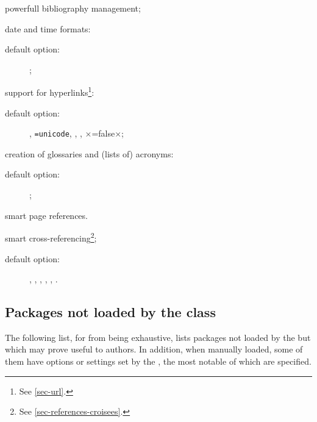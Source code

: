 \documentclass[english,nolocaltoc]{nwejmart}
\newtheorem[style=definition]{fact}
\newtheorem[title=experience]{experience}
\newtheorem[title-plural=rings]{ring}
\newtheorem[title=ideal,title-plural=ideals]{ideal}
\begin{document}
\begin{description}
\begin{description}
  \end{description}
\item[\package{biblatex}:] powerfull bibliography management;
\item[\package{datetime2}:] date  and time formats:
  \begin{description}
  \item[default option:] ;
  \end{description}
\item[\package{hyperref} :] support for hyperlinks\footnote{See \vref{sec-url}.}:
  \begin{description}
  \item[default option:] ,
    \lstinline[alsolanguage={[hyperref]TeX}]×=unicode×,
    , ,
    ×=false×;
  \end{description}
\item[\package{glossaries}:] creation of glossaries and  (lists of) acronyms:
  \begin{description}
  \item[default option:] ;
  \end{description}
\item[\package{varioref}:] smart page references.
\item[\package{cleveref}:] smart cross-referencing\footnote{See \vref{sec-references-croisees}.};
  \begin{description}
  \item[default option:] , ,
    , , ,
    .
  \end{description}
\end{description}

\subsection{Packages not loaded by the  class}\label{sec:packages-non-charges}

The following list, for from being exhaustive, lists packages not
loaded by the \nwejmauthorcl{} but which may prove useful to
authors. In addition, when manually loaded, some of them have options
or settings set by the \nwejmauthorcl{}, the most notable of which are specified. 
\end{document}
